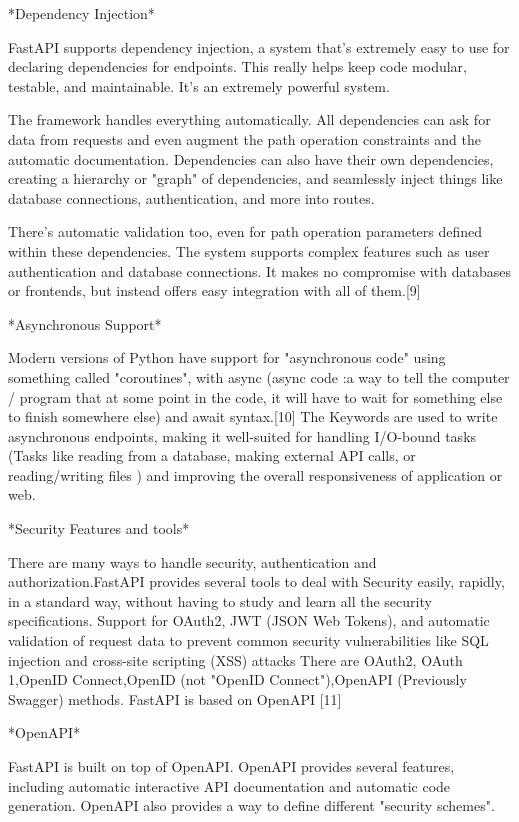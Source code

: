 *Dependency Injection*

FastAPI supports dependency injection, a system that's extremely easy to use for declaring dependencies for endpoints. This really helps keep code modular, testable, and maintainable. It's an extremely powerful system.

The framework handles everything automatically. All dependencies can ask for data from requests and even augment the path operation constraints and the automatic documentation. Dependencies can also have their own dependencies, creating a hierarchy or "graph" of dependencies, and seamlessly inject things like database connections, authentication, and more into routes.

There's automatic validation too, even for path operation parameters defined within these dependencies. The system supports complex features such as user authentication and database connections. It makes no compromise with databases or frontends, but instead offers easy integration with all of them.[9]
\

*Asynchronous Support*

Modern versions of Python have support for "asynchronous code" using something called "coroutines", with async (async code :a way to tell the computer / program that at some point in the code, it will have to wait for something else to finish somewhere else) and await syntax.[10]
The Keywords are used to write asynchronous endpoints, making it well-suited for handling I/O-bound tasks (Tasks like reading from a database, making external API calls, or reading/writing files ) and improving the overall responsiveness of application or web.

*Security Features and tools*

There are many ways to handle security, authentication and authorization.FastAPI provides several tools to deal with Security easily, rapidly, in a standard way, without having to study and learn all the security specifications. Support for OAuth2, JWT (JSON Web Tokens), and automatic validation of request data to prevent common security vulnerabilities like SQL injection and cross-site scripting (XSS) attacks
There are OAuth2, OAuth 1,OpenID Connect,OpenID (not "OpenID Connect"),OpenAPI (Previously Swagger) methods. FastAPI is based on OpenAPI [11]

*OpenAPI*

FastAPI is built on top of OpenAPI. OpenAPI provides several features, including automatic interactive API documentation and automatic code generation. OpenAPI also provides a way to define different "security schemes".

